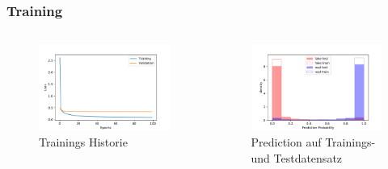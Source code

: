\documentclass[aspectratio=1610, professionalfonts, 9pt]{beamer}
\begin{document}
  \begin{frame}
    \frametitle{Training}
    \begin{columns}
      \begin{figure}
          \includegraphics[width=\textwidth]{pictures/bow/history_bow_best.pdf}
          \caption{Trainings Historie}
          \label{}
      \end{figure}
      
      \begin{figure}
          \includegraphics[width=\textwidth]{pictures/bow/prob_bow_best_nn.pdf}
          \caption{Prediction auf Trainings- und Testdatensatz}
          \label{}
      \end{figure}
      
    \end{columns}
  \end{frame}
\end{document}
